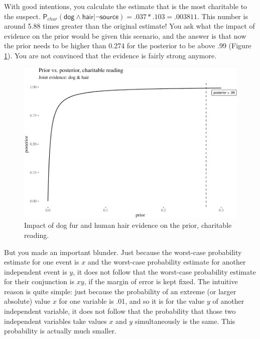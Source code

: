\documentclass[
  10pt,
  dvipsnames,enabledeprecatedfontcommands]{scrartcl}
\newcommand{\s}[1]{\mbox{$\mathsf{#1}$}}
\begin{document}
With good intentions, you calculate the estimate that is the most
charitable to the suspect.
\(\mathsf{P}_{char}(\s{dog}\wedge \s{hair} \vert \neg \s{source}) = .037 * .103 =.003811\).
This number is around 5.88 times greater than the original estimate! You
ask what the impact of evidence on the prior would be given this
scenario, and the answer is that now the prior needs to be higher than
0.274 for the posterior to be above .99 (Figure
\ref{fig:impactOfCharitable}). You are not convinced that the evidence
is fairly strong anymore.

\begin{figure}[H]


\begin{center}\includegraphics[width=0.8\linewidth]{chapter-outline_files/figure-latex/fig:charitableImpact7-1} \end{center}

\caption{Impact of dog fur and human hair evidence on the prior, charitable reading.}

\label{fig:impactOfCharitable}

\end{figure}

But you made an important blunder. Just because the worst-case
probability estimate for one event is \(x\) and the worst-case
probability estimate for another independent event is \(y\), it does not
follow that the worst-case probability estimate for their conjunction is
\(xy\), if the margin of error is kept fixed. The intuitive reason is
quite simple: just because the probability of an extreme (or larger
absolute) value \(x\) for one variable is .01, and so it is for the
value \(y\) of another independent variable, it does not follow that the
probability that those two independent variables take values \(x\) and
\(y\) simultaneously is the same. This probability is actually much
smaller.
\end{document}
